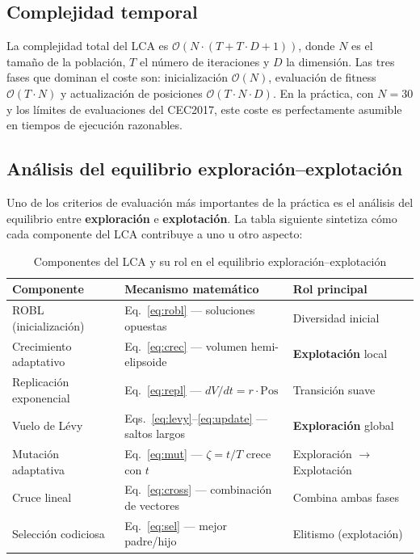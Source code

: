 \subsection{Complejidad temporal}

La complejidad total del LCA es $\mathcal{O}(N \cdot (T + T \cdot D + 1))$, donde $N$
es el tamaño de la población, $T$ el número de iteraciones y $D$ la dimensión. Las tres
fases que dominan el coste son: inicialización $\mathcal{O}(N)$, evaluación de fitness
$\mathcal{O}(T \cdot N)$ y actualización de posiciones $\mathcal{O}(T \cdot N \cdot D)$.
En la práctica, con $N=30$ y los límites de evaluaciones del CEC2017, este coste es perfectamente
asumible en tiempos de ejecución razonables.

\subsection{Análisis del equilibrio exploración–explotación}

Uno de los criterios de evaluación más importantes de la práctica es el análisis del
equilibrio entre \textbf{exploración} e \textbf{explotación}. La tabla siguiente sintetiza
cómo cada componente del LCA contribuye a uno u otro aspecto:

\begin{table}[h!]
\centering
\caption{Componentes del LCA y su rol en el equilibrio exploración–explotación}
\label{tab:equilibrio}
\renewcommand{\arraystretch}{1.35}
\footnotesize
\begin{tabular}{@{}lll@{}}
\toprule
\textbf{Componente} & \textbf{Mecanismo matemático} & \textbf{Rol principal} \\
\midrule
ROBL (inicialización) & Eq.~\ref{eq:robl} — soluciones opuestas & Diversidad inicial \\
Crecimiento adaptativo & Eq.~\ref{eq:crec} — volumen hemi-elipsoide & \textbf{Explotación} local \\
Replicación exponencial & Eq.~\ref{eq:repl} — $dV/dt = r \cdot \text{Pos}$ & Transición suave \\
Vuelo de Lévy & Eqs.~\ref{eq:levy}--\ref{eq:update} — saltos largos & \textbf{Exploración} global \\
Mutación adaptativa & Eq.~\ref{eq:mut} — $\zeta = t/T$ crece con $t$ & Exploración $\to$ Explotación \\
Cruce lineal & Eq.~\ref{eq:cross} — combinación de vectores & Combina ambas fases \\
Selección codiciosa & Eq.~\ref{eq:sel} — mejor padre/hijo & Elitismo (explotación) \\
\bottomrule
\end{tabular}
\end{table}

